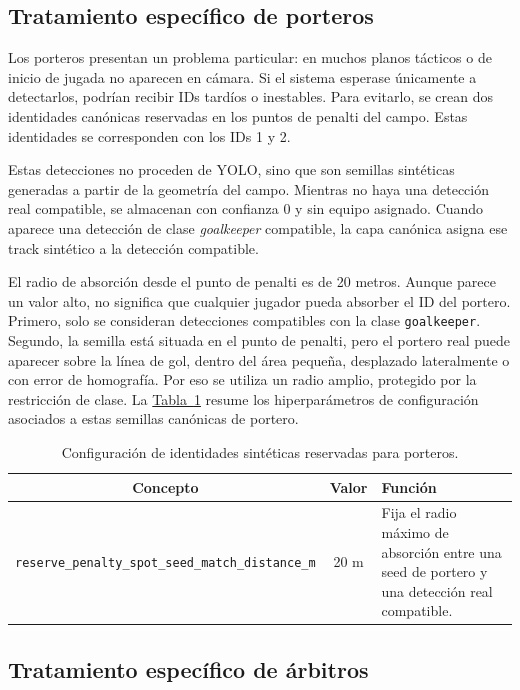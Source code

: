 \subsection{Tratamiento específico de porteros}
\label{subsec:tratamiento-porteros}

Los porteros presentan un problema particular: en muchos planos tácticos o de inicio de jugada no aparecen en cámara. Si el sistema esperase únicamente a detectarlos, podrían recibir IDs tardíos o inestables. Para evitarlo, se crean dos identidades canónicas reservadas en los puntos de penalti del campo. Estas identidades se corresponden con los IDs 1 y 2.

Estas detecciones no proceden de YOLO, sino que son semillas sintéticas generadas a partir de la geometría del campo. Mientras no haya una detección real compatible, se almacenan con confianza 0 y sin equipo asignado. Cuando aparece una detección de clase \textit{goalkeeper} compatible, la capa canónica asigna ese track sintético a la detección compatible.

El radio de absorción desde el punto de penalti es de 20 metros. Aunque parece un valor alto, no significa que cualquier jugador pueda absorber el ID del portero. Primero, solo se consideran detecciones compatibles con la clase \texttt{goalkeeper}. Segundo, la semilla está situada en el punto de penalti, pero el portero real puede aparecer sobre la línea de gol, dentro del área pequeña, desplazado lateralmente o con error de homografía. Por eso se utiliza un radio amplio, protegido por la restricción de clase. La \hyperref[tab:seeds-porteros]{Tabla~\ref*{tab:seeds-porteros}} resume los hiperparámetros de configuración asociados a estas semillas canónicas de portero.

\begin{table}[htbp]
    \centering
    \scriptsize
    \begin{tabular}{c|c|p{7.5cm}}
        \textbf{Concepto} & \textbf{Valor} & \textbf{Función} \\
        \hline\hline
        \texttt{reserve\_penalty\_spot\_seed\_match\_distance\_m} & 20 m & Fija el radio máximo de absorción entre una seed de portero y una detección real compatible. \\
        \hline
    \end{tabular}
    \caption{Configuración de identidades sintéticas reservadas para porteros.}
    \label{tab:seeds-porteros}
\end{table}

\subsection{Tratamiento específico de árbitros}
\label{subsec:tratamiento-arbitros}

